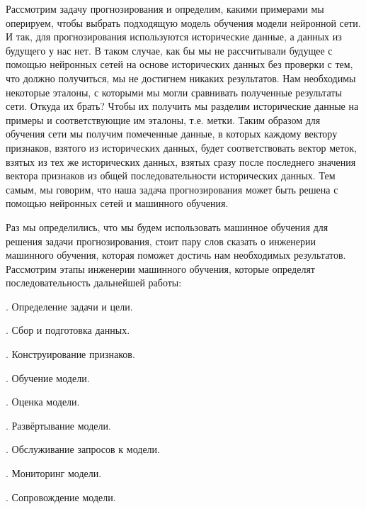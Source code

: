 {  \par \redline	Рассмотрим задачу прогнозирования и определим, какими примерами мы оперируем, чтобы выбрать подходящую модель обучения модели нейронной сети. И так, для прогнозирования используются исторические данные, а данных из будущего у нас нет. В таком случае, как бы мы не рассчитывали будущее с помощью нейронных сетей на основе исторических данных без проверки с тем, что должно получиться, мы не достигнем никаких результатов. Нам необходимы некоторые эталоны, с которыми мы могли сравнивать полученные результаты сети. Откуда их брать? Чтобы их получить мы разделим исторические данные на примеры и соответствующие им эталоны, т.е. метки. Таким образом для обучения сети мы получим помеченные данные, в которых каждому вектору признаков, взятого из исторических данных, будет соответствовать вектор меток, взятых из тех же исторических данных, взятых сразу после последнего значения вектора признаков из общей последовательности исторических данных. Тем самым, мы говорим, что наша задача прогнозирования может быть решена с помощью нейронных сетей и машинного обучения.

  \par \redline Раз мы определились, что мы будем использовать машинное обучения для решения задачи прогнозирования, стоит пару слов сказать о инженерии машинного обучения, которая поможет достичь нам необходимых результатов. Рассмотрим этапы инженерии машинного обучения, которые определят последовательность дальнейшей работы:

  \par {}. Определение задачи и цели. 
  \par {}. Сбор и подготовка данных. 
  \par {}. Конструирование признаков.
  \par {}. Обучение модели.
  \par {}. Оценка модели.
  \par {}. Развёртывание модели.
  \par {}. Обслуживание запросов к модели.
  \par {}. Мониторинг модели.
  \par {}. Сопровождение модели. 

}
